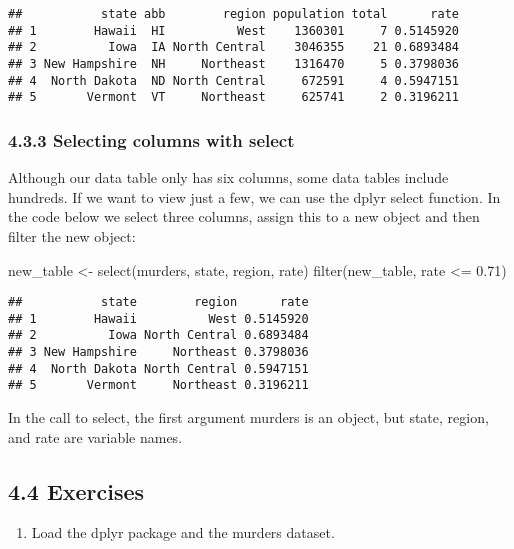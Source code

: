 \documentclass[
]{article}
\newenvironment{Shaded}{\begin{snugshade}}{\end{snugshade}}
\newcommand{\FloatTok}[1]{\textcolor[rgb]{0.00,0.00,0.81}{#1}}
\newcommand{\FunctionTok}[1]{\textcolor[rgb]{0.00,0.00,0.00}{#1}}
\newcommand{\NormalTok}[1]{#1}
\newcommand{\OtherTok}[1]{\textcolor[rgb]{0.56,0.35,0.01}{#1}}
\newcommand{\SpecialCharTok}[1]{\textcolor[rgb]{0.00,0.00,0.00}{#1}}
\providecommand{\tightlist}{%
  \setlength{\itemsep}{0pt}\setlength{\parskip}{0pt}}
\begin{document}
\begin{verbatim}
##           state abb        region population total      rate
## 1        Hawaii  HI          West    1360301     7 0.5145920
## 2          Iowa  IA North Central    3046355    21 0.6893484
## 3 New Hampshire  NH     Northeast    1316470     5 0.3798036
## 4  North Dakota  ND North Central     672591     4 0.5947151
## 5       Vermont  VT     Northeast     625741     2 0.3196211
\end{verbatim}

\hypertarget{selecting-columns-with-select}{%
\subsubsection{4.3.3 Selecting columns with
select}\label{selecting-columns-with-select}}

Although our data table only has six columns, some data tables include
hundreds. If we want to view just a few, we can use the dplyr select
function. In the code below we select three columns, assign this to a
new object and then filter the new object:

\begin{Shaded}
\begin{Highlighting}[]
\NormalTok{new\_table }\OtherTok{\textless{}{-}} \FunctionTok{select}\NormalTok{(murders, state, region, rate)}
\FunctionTok{filter}\NormalTok{(new\_table, rate }\SpecialCharTok{\textless{}=} \FloatTok{0.71}\NormalTok{)}
\end{Highlighting}
\end{Shaded}

\begin{verbatim}
##           state        region      rate
## 1        Hawaii          West 0.5145920
## 2          Iowa North Central 0.6893484
## 3 New Hampshire     Northeast 0.3798036
## 4  North Dakota North Central 0.5947151
## 5       Vermont     Northeast 0.3196211
\end{verbatim}

In the call to select, the first argument murders is an object, but
state, region, and rate are variable names.

\hypertarget{exercises}{%
\subsection{4.4 Exercises}\label{exercises}}

\begin{enumerate}
\def\labelenumi{\arabic{enumi}.}
\tightlist
\item
  Load the dplyr package and the murders dataset.
\end{enumerate}
\end{document}
